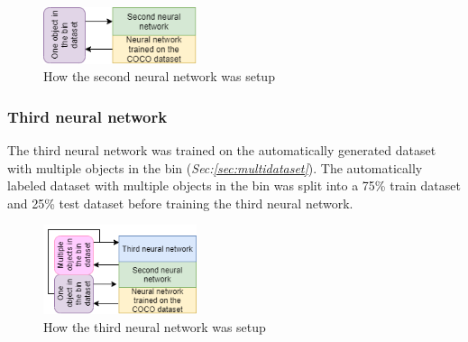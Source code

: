 \begin{figure}[h]
    \centering
    \includegraphics[width=0.4\textwidth]{graphics/methods/secondneural.png}
    \caption{How the second neural network was setup}
    \label{fig:secondneural}
\end{figure}

\subsubsection{Third neural network}
The third neural network was trained on the automatically generated dataset with multiple objects in the bin (\textit{Sec:\ref{sec:multidataset}}). The automatically labeled dataset with multiple objects in the bin was split into a 75\% train dataset and 25\% test dataset before training the third neural network. 

\begin{figure}[h]
    \centering
    \includegraphics[width=0.4\textwidth]{graphics/methods/thirdneural.png}
    \caption{How the third neural network was setup}
    \label{fig:thirdneural}
\end{figure}